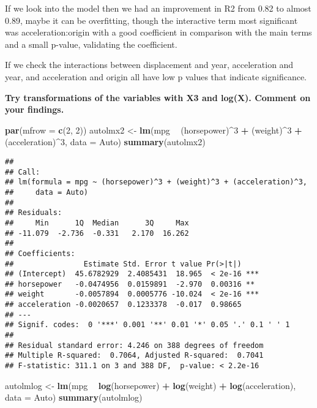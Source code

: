 \documentclass[]{article}
\newenvironment{Shaded}{\begin{snugshade}}{\end{snugshade}}
\newcommand{\KeywordTok}[1]{\textcolor[rgb]{0.13,0.29,0.53}{\textbf{#1}}}
\newcommand{\DataTypeTok}[1]{\textcolor[rgb]{0.13,0.29,0.53}{#1}}
\newcommand{\DecValTok}[1]{\textcolor[rgb]{0.00,0.00,0.81}{#1}}
\newcommand{\StringTok}[1]{\textcolor[rgb]{0.31,0.60,0.02}{#1}}
\newcommand{\OperatorTok}[1]{\textcolor[rgb]{0.81,0.36,0.00}{\textbf{#1}}}
\newcommand{\NormalTok}[1]{#1}
\begin{document}
If we look into the model then we had an improvement in R2 from 0.82 to
almost 0.89, maybe it can be overfitting, though the interactive term
most significant was acceleration:origin with a good coefficient in
comparison with the main terms and a small p-value, validating the
coefficient.

If we check the interactions between displacement and year, acceleration
and year, and acceleration and origin all have low p values that
indicate significance.

\textbf{Try transformations of the variables with X3 and log(X). Comment
on your findings.}

\begin{Shaded}
\begin{Highlighting}[]
\KeywordTok{par}\NormalTok{(}\DataTypeTok{mfrow =} \KeywordTok{c}\NormalTok{(}\DecValTok{2}\NormalTok{, }\DecValTok{2}\NormalTok{))}
\NormalTok{autolmx2 <-}\StringTok{ }\KeywordTok{lm}\NormalTok{(mpg }\OperatorTok{~}\StringTok{ }\NormalTok{(horsepower)}\OperatorTok{^}\DecValTok{3} \OperatorTok{+}\StringTok{ }\NormalTok{(weight)}\OperatorTok{^}\DecValTok{3} \OperatorTok{+}\StringTok{ }\NormalTok{(acceleration)}\OperatorTok{^}\DecValTok{3}\NormalTok{, }\DataTypeTok{data =}\NormalTok{ Auto)}
\KeywordTok{summary}\NormalTok{(autolmx2)}
\end{Highlighting}
\end{Shaded}

\begin{verbatim}
## 
## Call:
## lm(formula = mpg ~ (horsepower)^3 + (weight)^3 + (acceleration)^3, 
##     data = Auto)
## 
## Residuals:
##     Min      1Q  Median      3Q     Max 
## -11.079  -2.736  -0.331   2.170  16.262 
## 
## Coefficients:
##                Estimate Std. Error t value Pr(>|t|)    
## (Intercept)  45.6782929  2.4085431  18.965  < 2e-16 ***
## horsepower   -0.0474956  0.0159891  -2.970  0.00316 ** 
## weight       -0.0057894  0.0005776 -10.024  < 2e-16 ***
## acceleration -0.0020657  0.1233378  -0.017  0.98665    
## ---
## Signif. codes:  0 '***' 0.001 '**' 0.01 '*' 0.05 '.' 0.1 ' ' 1
## 
## Residual standard error: 4.246 on 388 degrees of freedom
## Multiple R-squared:  0.7064, Adjusted R-squared:  0.7041 
## F-statistic: 311.1 on 3 and 388 DF,  p-value: < 2.2e-16
\end{verbatim}

\begin{Shaded}
\begin{Highlighting}[]
\NormalTok{autolmlog <-}\StringTok{ }\KeywordTok{lm}\NormalTok{(mpg }\OperatorTok{~}\StringTok{ }\KeywordTok{log}\NormalTok{(horsepower) }\OperatorTok{+}\StringTok{ }\KeywordTok{log}\NormalTok{(weight) }\OperatorTok{+}\StringTok{ }\KeywordTok{log}\NormalTok{(acceleration), }\DataTypeTok{data =}\NormalTok{ Auto)}
\KeywordTok{summary}\NormalTok{(autolmlog)}
\end{Highlighting}
\end{Shaded}
\end{document}
